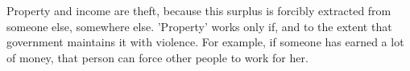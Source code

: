 Property and income are theft, because this surplus is forcibly extracted from someone else, somewhere else. 'Property' works only if, and to the extent that government maintains it with violence. For example, if someone has earned a lot of money, that person can force other people to work for her.

